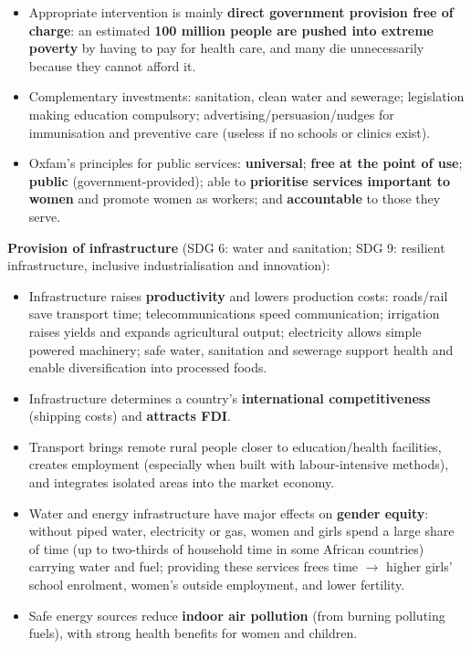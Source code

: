 \documentclass[a4paper,12pt]{article}
\begin{document}
\begin{itemize}
  \item Appropriate intervention is mainly \textbf{direct government provision free of charge}: an estimated \textbf{100 million people are pushed into extreme poverty} by having to pay for health care, and many die unnecessarily because they cannot afford it.
  \item Complementary investments: sanitation, clean water and sewerage; legislation making education compulsory; advertising/persuasion/nudges for immunisation and preventive care (useless if no schools or clinics exist).
  \item Oxfam's principles for public services: \textbf{universal}; \textbf{free at the point of use}; \textbf{public} (government-provided); able to \textbf{prioritise services important to women} and promote women as workers; and \textbf{accountable} to those they serve.
\end{itemize}
\textbf{Provision of infrastructure} (SDG 6: water and sanitation; SDG 9: resilient infrastructure, inclusive industrialisation and innovation):
\begin{itemize}
  \item Infrastructure raises \textbf{productivity} and lowers production costs: roads/rail save transport time; telecommunications speed communication; irrigation raises yields and expands agricultural output; electricity allows simple powered machinery; safe water, sanitation and sewerage support health and enable diversification into processed foods.
  \item Infrastructure determines a country's \textbf{international competitiveness} (shipping costs) and \textbf{attracts FDI}.
  \item Transport brings remote rural people closer to education/health facilities, creates employment (especially when built with labour-intensive methods), and integrates isolated areas into the market economy.
  \item Water and energy infrastructure have major effects on \textbf{gender equity}: without piped water, electricity or gas, women and girls spend a large share of time (up to two-thirds of household time in some African countries) carrying water and fuel; providing these services frees time $\to$ higher girls' school enrolment, women's outside employment, and lower fertility.
  \item Safe energy sources reduce \textbf{indoor air pollution} (from burning polluting fuels), with strong health benefits for women and children.
\end{itemize}
\end{document}
